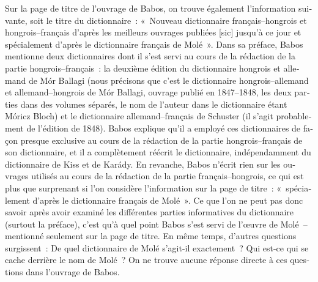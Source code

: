 \documentclass[output=paper,colorlinks,citecolor=brown,arabicfont,chinesefont,booklanguage=french]{langscibook}
\begin{document}
\begin{otherlanguage}{french}
Sur la page de titre de l’ouvrage de Babos, on trouve également l’information suivante, soit le titre du dictionnaire~: «~Nouveau dictionnaire français–hongrois et hongrois–français d’après les meilleurs ouvrages publiées [sic] jusqu’à ce jour et spécialement d’après le dictionnaire français de Molé~». Dans sa préface, Babos mentionne deux dictionnaires dont il s’est servi au cours de la rédaction de la partie hongrois–français~: la deuxième édition du dictionnaire hongrois et allemand de Mór Ballagi (nous précisons que c’est le dictionnaire hongrois–allemand et allemand–hongrois de Mór Ballagi, ouvrage publié en 1847–1848, les deux parties dans des volumes séparés, le nom de l’auteur dans le dictionnaire étant Móricz Bloch) et le dictionnaire allemand–français de Schuster (il s’agit probablement de l’édition de 1848). Babos explique qu'il a employé ces dictionnaires de façon presque exclusive au cours de la rédaction de la partie hongrois–français de son dictionnaire, et il a complètement réécrit le dictionnaire, indépendamment du dictionnaire de Kiss et de Karády. En revanche, Babos n’écrit rien sur les ouvrages utilisés au cours de la rédaction de la partie français–hongrois, ce qui est plus que surprenant si l’on considère l’information sur la page de titre~: «~spécialement d’après le dictionnaire français de Molé~». Ce que l’on ne peut pas donc savoir après avoir examiné les différentes parties informatives du dictionnaire (surtout la préface), c’est qu’à quel point Babos s’est servi de l’œuvre de Molé~-- mentionné seulement sur la page de titre. En même temps, d’autres questions surgissent~: De quel dictionnaire de Molé s’agit-il exactement~? Qui est-ce qui se cache derrière le nom de Molé~? On ne trouve aucune réponse directe à ces questions dans l’ouvrage de Babos. 


\end{otherlanguage}
\end{document}
